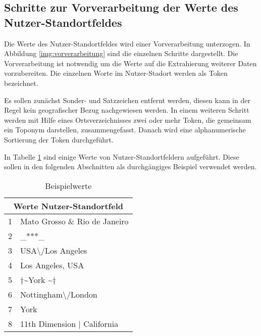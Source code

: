 		\subsection{Schritte zur Vorverarbeitung der Werte des Nutzer-Standortfeldes}

			Die Werte des Nutzer-Standortfeldes wird einer Vorverarbeitung unterzogen.
			In Abbildung \ref{img:vorverarbeitung} sind die einzelnen Schritte dargestellt.
			Die Vorverarbeitung ist notwendig um die Werte auf die Extrahierung weiterer Daten vorzubereiten.
			Die einzelnen Worte im Nutzer-Stadort werden als Token bezeichnet. 
			
			Es sollen zunächst Sonder- und Satzzeichen entfernt werden, diesen kann in der Regel kein geografischer Bezug nachgewiesen werden.
			In einem weiteren Schritt werden mit Hilfe eines Ortsverzeichnisses zwei oder mehr Token, die gemeinsam ein Toponym darstellen, zusammengefasst.
			Danach wird eine alphanumerische Sortierung der Token durchgeführt.

			In Tabelle \ref{tab:VorverarbeitungBsp1} sind einige Werte von Nutzer-Standortfeldern aufgeführt.
			Diese sollen in den folgenden Abschnitten als durchgängiges Beispiel verwendet werden.

				\begin{table}[h]
					\centering
					\caption{Beispielwerte}
					\label{tab:VorverarbeitungBsp1}
					\begin{tabular}{|l|l|}
					\hline 
					\multicolumn{2}{|c|}{\textbf{Werte Nutzer-Standortfeld}} \\ \hline \hline
					1&Mato Grosso \& Rio de Janeiro                      			\\ \hline
					2&\_***\_                                         			\\ \hline
					3&USA\textbackslash /Los Angeles                  			\\ \hline
					4&Los Angeles, USA                                			\\ \hline
					5&$\dagger$\textasciitilde York \textasciitilde$\dagger$      \\ \hline
					6&Nottingham\textbackslash /London                			\\ \hline
					7&York                                            			\\ \hline
					8&11th Dimension | California 					\\ \hline	
					\end{tabular}
				\end{table} 
			 
